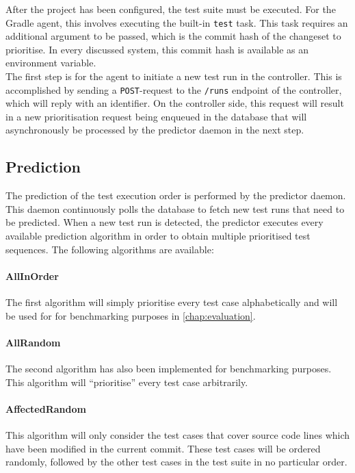\noindent After the project has been configured, the test suite must be executed. For the Gradle agent, this involves executing the built-in \texttt{test} task. This task requires an additional argument to be passed, which is the commit hash of the changeset to prioritise. In every discussed \CI{} system, this commit hash is available as an environment variable.\\

\noindent The first step is for the agent to initiate a new test run in the controller. This is accomplished by sending a \texttt{POST}-request to the \texttt{/runs} endpoint of the controller, which will reply with an identifier. On the controller side, this request will result in a new prioritisation request being enqueued in the database that will asynchronously be processed by the predictor daemon in the next step.

\subsection{Prediction}
The prediction of the test execution order is performed by the predictor daemon. This daemon continuously polls the database to fetch new test runs that need to be predicted. When a new test run is detected, the predictor executes every available prediction algorithm in order to obtain multiple prioritised test sequences. The following algorithms are available:

\paragraph*{AllInOrder} The first algorithm will simply prioritise every test case alphabetically and will be used for for benchmarking purposes in \autoref{chap:evaluation}.

\paragraph*{AllRandom} The second algorithm has also been implemented for benchmarking purposes. This algorithm will ``prioritise'' every test case arbitrarily.

\paragraph*{AffectedRandom} This algorithm will only consider the test cases that cover source code lines which have been modified in the current commit. These test cases will be ordered randomly, followed by the other test cases in the test suite in no particular order.

